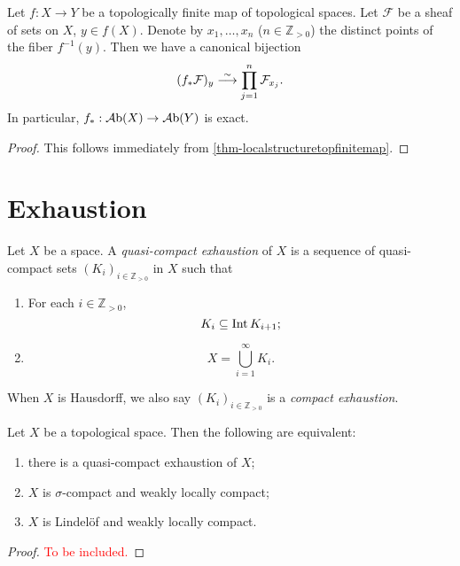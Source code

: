 \begin{corollary}\label{cor-pushforwardsheaffinite}
    Let $f:X\rightarrow Y$ be a topologically finite map of topological spaces. Let $\mathcal{F}$ be a sheaf of sets on $X$, $y\in f(X)$. Denote by $x_1,\ldots,x_n$ ($n\in \mathbb{Z}_{>0}$) the distinct points of the fiber $f^{-1}(y)$. Then we have a canonical bijection
    \[
        (f_*\mathcal{F})_y\stackrel{\sim}{\longrightarrow} \prod_{j=1}^n \mathcal{F}_{x_j}.
    \]
    In particular, $f_*:\mathcal{A}\mathrm{b}(X)\rightarrow \mathcal{A}\mathrm{b}(Y)$ is exact.
\end{corollary}
\begin{proof}
    This follows immediately from \cref{thm-localstructuretopfinitemap}.
\end{proof}


\section{Exhaustion}

\begin{definition}\label{def-exhaustion}
    Let $X$ be a space. A \emph{quasi-compact exhaustion}  of $X$ is a sequence of quasi-compact sets $(K_i)_{i\in \mathbb{Z}_{>0}}$ in $X$ such that 
    \begin{enumerate}
        \item For each $i\in \mathbb{Z}_{>0}$,
            \[
                K_i\subseteq \operatorname{Int} K_{i+1};  
            \]
        \item 
            \[
                X=\bigcup_{i=1}^{\infty}K_i.
            \]
    \end{enumerate}
    When $X$ is Hausdorff, we also say $(K_i)_{i\in \mathbb{Z}_{>0}}$ is a \emph{compact exhaustion}.
\end{definition}

\begin{proposition}\label{prop-qcptexhaustion}
    Let $X$ be a topological space. Then the following are equivalent:
    \begin{enumerate}
        \item there is a quasi-compact exhaustion of $X$;
        \item $X$ is $\sigma$-compact and weakly locally compact;
        \item $X$ is Lindelöf and weakly locally compact.
    \end{enumerate}
\end{proposition}
\begin{proof}
    \textcolor{red}{To be included.}
\end{proof}

